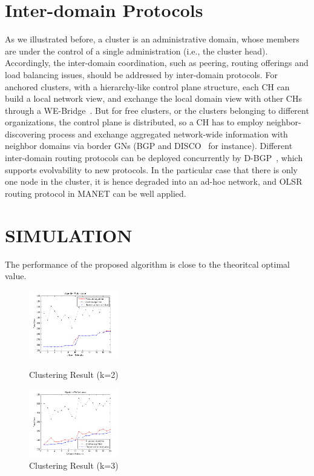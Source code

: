 \documentclass[conference]{IEEEtran}
\begin{document}
\section{Inter-domain Protocols}
As we illustrated before, a cluster is an administrative domain, whose members are under the control of a single administration (i.e., the cluster head). Accordingly, the inter-domain coordination, such as peering, routing offerings and load balancing issues, should be addressed by inter-domain protocols. For anchored clusters, with a hierarchy-like control plane structure, each CH can build a local network view, and exchange the local domain view with other CHs through a WE-Bridge~\cite{lin2014we}. But for free clusters, or the clusters belonging to different organizations, the control plane is distributed, so a CH has to employ neighbor-discovering process and exchange aggregated network-wide information with neighbor domains via border GNs (BGP and DISCO~\cite{phemius2014disco} for instance). Different inter-domain routing protocols can be deployed concurrently by D-BGP~\cite{sambasivanbootstrapping}, which  supports evolvability to new protocols. In the particular case that there is only one node in the cluster, it is hence degraded into an ad-hoc network, and OLSR routing protocol in MANET can be well applied.

\section{SIMULATION}
The performance of the proposed algorithm is close to the theoritcal optimal value.

\begin{figure}[htbp]
  \centering
  \includegraphics[width=0.35\textwidth]{figures/k2}
  \caption{Clustering Result (k=2)}\label{fig:digit}
  \includegraphics[width=0.35\textwidth]{figures/k3}
  \caption{Clustering Result (k=3)}\label{fig:digit}
\end{figure}
\end{document}

